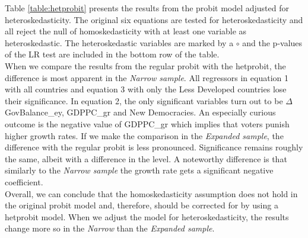 \documentclass[12pt]{article}
\begin{document}
Table \ref{table:hetprobit} presents the results from the probit model adjusted for heteroskedasticity. The original six equations are tested for heteroskedasticity and all reject the null of homoskedasticity with at least one variable as heteroskedastic. The heteroskedastic variables are marked by a $\circ$ and the p-values of the LR test are included in the bottom row of the table.\\
When we compare the results from the regular probit with the hetprobit, the difference is most apparent in the \textit{Narrow sample}. All regressors in equation 1 with all countries and equation 3 with only the Less Developed countries lose their significance. In equation 2, the only significant variables turn out to be $\Delta$GovBalance\_ey, GDPPC\_gr and New Democracies. An especially curious outcome is the negative value of GDPPC\_gr which implies that voters punish higher growth rates. If we make the comparison in the \textit{Expanded sample}, the difference with the regular probit is less pronounced. Significance remains roughly the same, albeit with a difference in the level. A noteworthy difference is that similarly to the \textit{Narrow sample} the growth rate gets a significant negative coefficient.\\

Overall, we can conclude that the homoskedasticity assumption does not hold in the original probit model and, therefore, should be corrected for by using a hetprobit model. When we adjust the model for heteroskedasticity, the results change more so in the \textit{Narrow} than the \textit{Expanded sample}. \\
\end{document}
